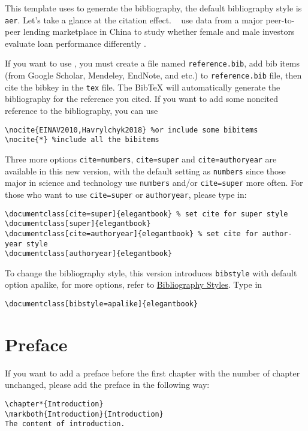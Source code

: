 \documentclass[11pt,fancy,twocol]{elegantbook}
\begin{document}
This template uses  to generate the bibliography, the default bibliography style is \lstinline{aer}. Let's take a glance at the citation effect. ~\cite{en1} use data from a major peer-to-peer lending \cite{en3} marketplace in China to study whether female and male investors evaluate loan performance differently \parencite{en2}. 

If you want to use , you must create a file named \lstinline{reference.bib}, add bib items (from Google Scholar, Mendeley, EndNote, and etc.) to \lstinline{reference.bib} file, then cite the bibkey in the \lstinline{tex} file. The Bib\TeX{} will automatically generate the bibliography for the reference you cited. If you want to add some noncited reference to the bibliography, you can use 
\begin{lstlisting}[frame=single]
\nocite{EINAV2010,Havrylchyk2018} %or include some bibitems
\nocite{*} %include all the bibitems
\end{lstlisting}

Three more options \lstinline{cite=numbers}, \lstinline{cite=super} and \lstinline{cite=authoryear} are available in this new version, with the default setting as \lstinline{numbers} since those major in science and technology use \lstinline{numbers} and/or \lstinline{cite=super} more often. For those who want to use \lstinline{cite=super} or \lstinline{authoryear}, please type in:
\begin{lstlisting}
\documentclass[cite=super]{elegantbook} % set cite for super style 
\documentclass[super]{elegantbook}
\documentclass[cite=authoryear]{elegantbook} % set cite for author-year style
\documentclass[authoryear]{elegantbook}
\end{lstlisting}

To change the bibliography style, this version introduces \lstinline{bibstyle} with default option apalike, for more options, refer to \href{https://www.overleaf.com/learn/latex/Bibtex_bibliography_styles}{ Bibliography Styles}. Type in
\begin{lstlisting}
\documentclass[bibstyle=apalike]{elegantbook} 
\end{lstlisting}

\section{Preface}

If you want to add a preface before the first chapter with the number of chapter unchanged, please add the preface in the following way:
\begin{lstlisting}
\chapter*{Introduction}
\markboth{Introduction}{Introduction}
The content of introduction.
\end{lstlisting}
\end{document}
